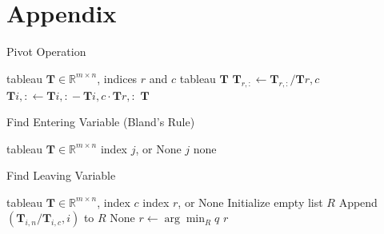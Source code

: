 \documentclass[conference]{IEEEtran}
\begin{document}
\clearpage
\section{Appendix}
\label{appendix}
\begin{algorithm}
    \caption{Pivot Operation}
    \label{alg:pivot}
    \begin{algorithmic}[1]
    \Require tableau $\textbf{T} \in \mathbb{R}^{m \times n}$, indices $r$ and $c$
    \Ensure tableau $\textbf{T}$
    \State $\textbf{T}_{r, :} \gets \textbf{T}_{r, :} / \textbf{T}{r, c}$ 
        \State $\textbf{T}{i, :} \gets \textbf{T}{i, :} - \textbf{T}{i, c} \cdot \textbf{T}{r, :}$ 
    \EndFor
    \State \Return $\textbf{T}$ 
    \end{algorithmic}
    \end{algorithm}
    
    \begin{algorithm}
    \caption{Find Entering Variable (Bland's Rule)}
    \label{alg:entering}
    \begin{algorithmic}[1]
    \Require tableau $\textbf{T} \in \mathbb{R}^{m \times n}$ 
    \Ensure index $j$, or None
            \State \Return $j$ 
        \EndIf
    \EndFor
    \State \Return none 
    \end{algorithmic}
    \end{algorithm}
    
    \begin{algorithm}
    \caption{Find Leaving Variable}
    \label{alg:leaving}
    \begin{algorithmic}[1]
    \Require tableau $\textbf{T} \in \mathbb{R}^{m \times n}$, index $c$
    \Ensure index $r$, or None
    \State Initialize empty list $R$
            \State Append $(\textbf{T}_{i, n} / \textbf{T}_{i, c}, i)$ to $R$
        \EndIf
    \EndFor
        \State \Return None 
    \EndIf
    \State $r \gets \arg \min_R q$ 
    \State \Return $r$ 
    \end{algorithmic}
    \end{algorithm}
    
\end{document}
